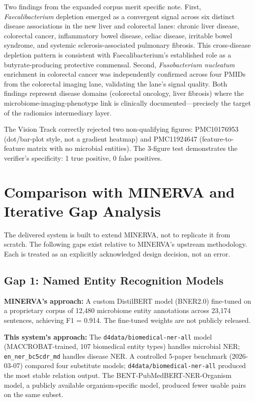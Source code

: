 \documentclass[12pt, letterpaper]{article}
\begin{document}
Two findings from the expanded corpus merit specific note. First, \textit{Faecalibacterium} depletion emerged as a convergent signal across six distinct disease associations in the new liver and colorectal lanes: chronic liver disease, colorectal cancer, inflammatory bowel disease, celiac disease, irritable bowel syndrome, and systemic sclerosis-associated pulmonary fibrosis. This cross-disease depletion pattern is consistent with Faecalibacterium's established role as a butyrate-producing protective commensal. Second, \textit{Fusobacterium nucleatum} enrichment in colorectal cancer was independently confirmed across four PMIDs from the colorectal imaging lane, validating the lane's signal quality. Both findings represent disease domains (colorectal oncology, liver fibrosis) where the microbiome-imaging-phenotype link is clinically documented---precisely the target of the radiomics intermediary layer.

The Vision Track correctly rejected two non-qualifying figures: PMC10176953 (dot/bar-plot style, not a gradient heatmap) and PMC11924647 (feature-to-feature matrix with no microbial entities). The 3-figure test demonstrates the verifier's specificity: 1 true positive, 0 false positives.

\section{Comparison with MINERVA and Iterative Gap Analysis}

The delivered system is built to extend MINERVA, not to replicate it from scratch. The following gaps exist relative to MINERVA's upstream methodology. Each is treated as an explicitly acknowledged design decision, not an error.

\subsection{Gap 1: Named Entity Recognition Models}

\textbf{MINERVA's approach:} A custom DistilBERT model (BNER2.0) fine-tuned on a proprietary corpus of 12,480 microbiome entity annotations across 23,174 sentences, achieving F1 = 0.914. The fine-tuned weights are not publicly released.

\textbf{This system's approach:} The \texttt{d4data/biomedical-ner-all} model (MACCROBAT-trained, 107 biomedical entity types) handles microbial NER; \texttt{en\_ner\_bc5cdr\_md} handles disease NER. A controlled 5-paper benchmark (2026-03-07) compared four substitute models; \texttt{d4data/biomedical-ner-all} produced the most stable relation output. The BENT-PubMedBERT-NER-Organism model, a publicly available organism-specific model, produced fewer usable pairs on the same subset.
\end{document}
